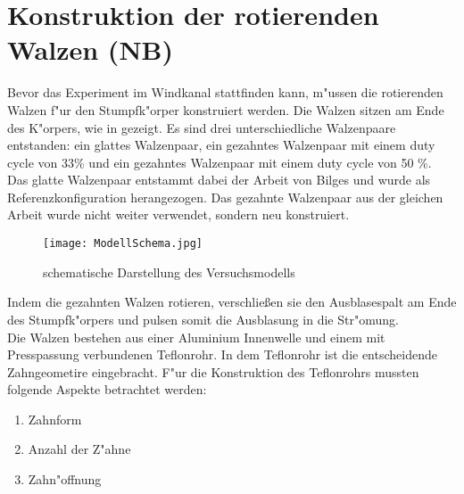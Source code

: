 \chapter{Konstruktion der rotierenden Walzen (NB)}
\label{s:rotierendeWalzen}
Bevor das Experiment im Windkanal stattfinden kann, m"ussen die rotierenden Walzen f"ur den Stumpfk"orper konstruiert werden. Die Walzen sitzen am Ende des K"orpers, wie in  gezeigt. Es sind drei unterschiedliche Walzenpaare entstanden: ein glattes Walzenpaar, ein gezahntes Walzenpaar mit einem duty cycle von 33\% und ein gezahntes Walzenpaar mit einem duty cycle von 50 \%.\\
Das glatte Walzenpaar entstammt dabei der Arbeit von Bilges \cite{Bilges.2018} und wurde als Referenzkonfiguration herangezogen. Das gezahnte Walzenpaar aus der gleichen Arbeit wurde nicht weiter verwendet, sondern neu konstruiert.

\begin{figure}[h]
	\centering
	\texttt{[image: ModellSchema.jpg]}
	\caption{schematische Darstellung des Versuchsmodells}
	\label{fig:modelschema}
\end{figure}
Indem die gezahnten Walzen rotieren, verschlie\ss{}en sie den Ausblasespalt am Ende des Stumpfk"orpers und pulsen somit die Ausblasung in die Str"omung.\\
Die Walzen bestehen aus einer Aluminium Innenwelle und einem mit Presspassung verbundenen Teflonrohr. In dem Teflonrohr ist die entscheidende Zahngeometire eingebracht. F"ur die Konstruktion des Teflonrohrs mussten folgende Aspekte betrachtet werden:
\begin{enumerate}
	\item Zahnform 
	\item Anzahl der Z"ahne
	\item Zahn"offnung 
\end{enumerate}

